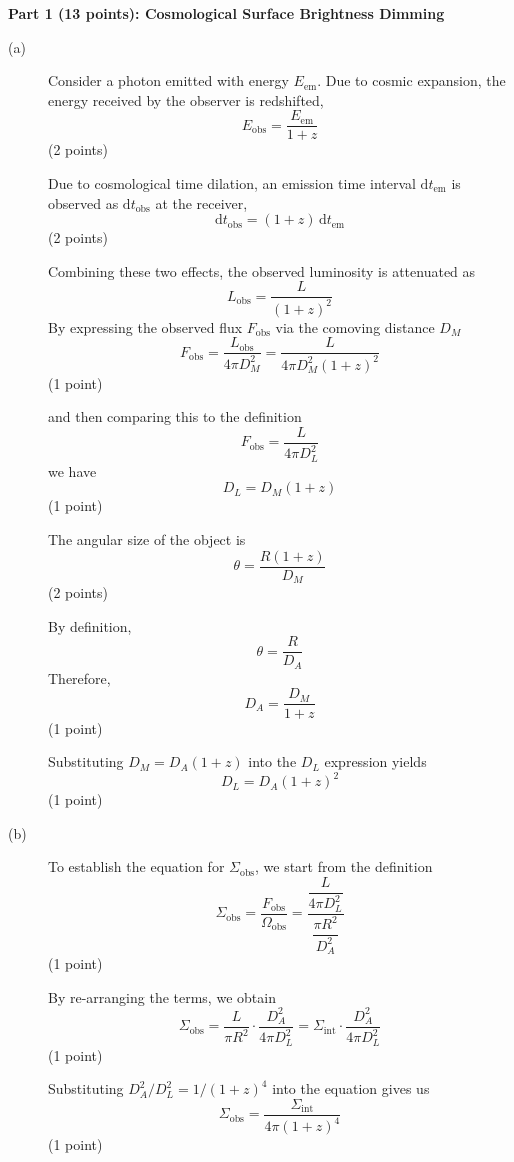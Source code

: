 \noindent\textbf{Part 1 (13 points): Cosmological Surface Brightness Dimming}
\begin{description}
\item[(a)] Consider a photon emitted with energy $E_{\mathrm{em}}$. Due to
  cosmic expansion, the energy received by the observer is redshifted,
  \[ E_{\mathrm{obs}} = \frac{E_{\mathrm{em}}}{1+z} \]
  \hfill(2 points)

  Due to cosmological time dilation, an emission time interval
  $\mathrm{d}t_{\mathrm{em}}$ is observed as $\mathrm{d}t_{\mathrm{obs}}$ at
  the receiver,
  \[ \mathrm{d}t_{\mathrm{obs}} = (1+z)\,\mathrm{d}t_{\mathrm{em}} \]
  \hfill(2 points)

  Combining these two effects, the observed luminosity is attenuated as
  \[ L_{\mathrm{obs}} = \frac{L}{(1+z)^2} \]
  By expressing the observed flux $F_{\mathrm{obs}}$ via the comoving distance
  $D_M$
  \[ F_{\mathrm{obs}} = \frac{L_{\mathrm{obs}}}{4\pi D_M^2}
     = \frac{L}{4\pi D_M^2 (1+z)^2} \]
  \hfill(1 point)

  and then comparing this to the definition
  \[ F_{\mathrm{obs}} = \frac{L}{4\pi D_L^2} \]
  we have
  \[ D_L = D_M (1+z) \]
  \hfill(1 point)

  The angular size of the object is
  \[ \theta = \frac{R(1+z)}{D_M} \]
  \hfill(2 points)

  By definition,
  \[ \theta = \frac{R}{D_A} \]
  Therefore,
  \[ D_A = \frac{D_M}{1+z} \]
  \hfill(1 point)

  Substituting $D_M = D_A(1+z)$ into the $D_L$ expression yields
  \[ D_L = D_A (1+z)^2 \]
  \hfill(1 point)

\item[(b)] To establish the equation for $\Sigma_{\mathrm{obs}}$, we start
  from the definition
  \[ \Sigma_{\mathrm{obs}} = \frac{F_{\mathrm{obs}}}{\Omega_{\mathrm{obs}}}
     = \frac{\dfrac{L}{4\pi D_L^2}}{\dfrac{\pi R^2}{D_A^2}} \]
  \hfill(1 point)

  By re-arranging the terms, we obtain
  \[ \Sigma_{\mathrm{obs}} = \frac{L}{\pi R^2} \cdot \frac{D_A^2}{4\pi D_L^2}
     = \Sigma_{\mathrm{int}} \cdot \frac{D_A^2}{4\pi D_L^2} \]
  \hfill(1 point)

  Substituting $D_A^2/D_L^2 = 1/(1+z)^4$ into the equation gives us
  \[ \Sigma_{\mathrm{obs}} = \frac{\Sigma_{\mathrm{int}}}{4\pi(1+z)^4} \]
  \hfill(1 point)
\end{description}

